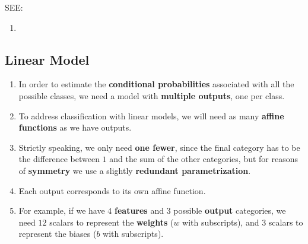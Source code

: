 SEE: 
\begin{enumerate}
    \item {}
\end{enumerate}

\subsection{Linear Model \cite{dnn-1}} \label{classification: Softmax Regression: Linear Model}

\begin{enumerate}[itemsep=0.2cm]
    \item In order to estimate the \textbf{conditional probabilities} associated with all the possible classes, we need a model with \textbf{multiple outputs}, one per class. 
    
    \item To address classification with linear models, we will need as many \textbf{affine functions} as we have outputs. 
    
    \item Strictly speaking, we only need \textbf{one fewer}, since the final category has to be the difference between $1$ and the sum of the other categories, but for reasons of \textbf{symmetry} we use a slightly \textbf{redundant parametrization}. 
    
    \item Each output corresponds to its own affine function. 
    
    \item For example, if we have $4$ \textbf{features} and $3$ possible \textbf{output} categories, we need $12$ scalars to represent the \textbf{weights} ($w$ with subscripts), and $3$ scalars to represent the biases ($b$ with subscripts). 
    

\end{enumerate}
